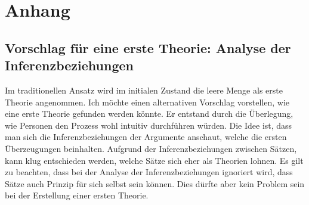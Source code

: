 \documentclass{article}
\begin{document}
\newpage
\printbibliography

\newpage

\section{Anhang}
\subsection{ Vorschlag für eine erste Theorie: Analyse der Inferenzbeziehungen} \label{better-first-theory}
Im traditionellen Ansatz wird im initialen Zustand die leere Menge als erste Theorie angenommen. Ich möchte einen alternativen Vorschlag vorstellen, wie eine erste Theorie gefunden werden könnte. Er entstand durch die Überlegung, wie Personen den Prozess wohl intuitiv durchführen würden. Die Idee ist, dass man sich die Inferenzbeziehungen der Argumente anschaut, welche die ersten Überzeugungen beinhalten. Aufgrund der Inferenzbeziehungen zwischen Sätzen, kann klug entschieden werden, welche Sätze sich eher als Theorien lohnen. Es gilt zu beachten, dass bei der Analyse der Inferenzbeziehungen ignoriert wird, dass Sätze auch Prinzip für sich selbst sein können. Dies dürfte aber kein Problem sein bei der Erstellung einer ersten Theorie.
\end{document}
